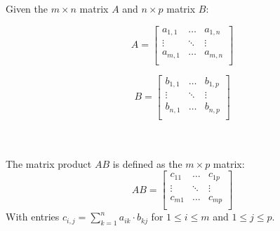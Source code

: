 \begin{mydef}
	Given the $m \times n$ matrix $A$ and $n \times p$ matrix $B$: \\ \par
	\begin{minipage}{0.4\linewidth}
	\begin{equation*}
		A = 
		\begin{bmatrix}
			a_{1 ,1} & \ldots & a_{1, n} \\
			\vdots & \ddots & \vdots \\
			a_{m ,1} & \ldots & a_{m, n} \\
		\end{bmatrix}
	\end{equation*}
\end{minipage}	
\begin{minipage}[b]{0.59\linewidth}
	\begin{equation*}
		B = 
		\begin{bmatrix}
			b_{1 ,1} & \ldots & b_{1, p} \\
			\vdots & \ddots & \vdots \\
			b_{n ,1} & \ldots & b_{n, p} \\
		\end{bmatrix}
	\end{equation*}
\end{minipage}
\\ \\
The matrix product $AB$ is defined as the $m \times p$ matrix:
	\begin{equation*}
		AB = 
		\begin{bmatrix}
			c_{11} & \ldots & c_{1p} \\
			\vdots & \ddots & \vdots \\
			c_{m1} & \ldots & c_{mp} \\
		\end{bmatrix}
	\end{equation*} 
	With entries $c_{i,j} = \sum_{k=1}^n a_{ik}\cdot b_{kj}$ for $1 \leq i \leq m$ and $1 \leq j \leq p$.
	\end{mydef}

